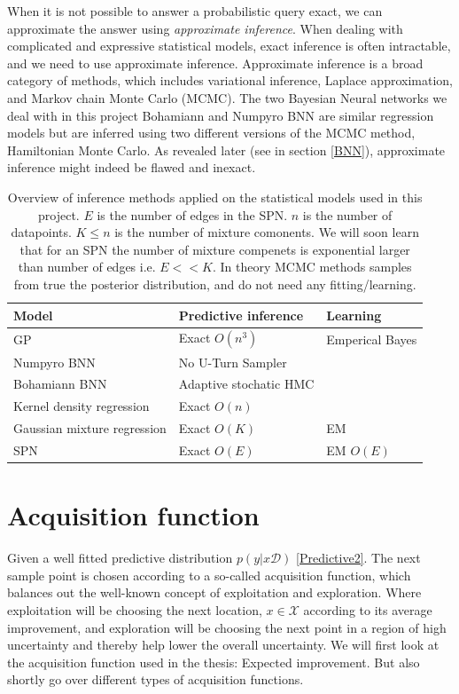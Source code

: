 When it is not possible to answer a probabilistic query exact, we can approximate the answer using
\textit{approximate inference}. When dealing with complicated and expressive statistical models,
exact inference is often intractable, and we need to use approximate inference. Approximate
inference is a broad category of methods, which includes variational inference, Laplace
approximation, and Markov chain Monte Carlo (MCMC). The two Bayesian Neural networks we deal with in
this project Bohamiann and Numpyro BNN are similar regression models but are inferred using two
different versions of the MCMC method, Hamiltonian Monte Carlo. As revealed later (see in section
\ref{BNN}), approximate inference might indeed be flawed and inexact. 

\begin{table}[H]
    \centering
    \begin{tabular}{l|l|l}
    \textbf{Model}       & \textbf{Predictive inference}    &   \textbf{Learning} \\ \hline
    GP                          & Exact $O(n^3)$            & Emperical Bayes\\
    Numpyro BNN                 & No U-Turn Sampler         & \\
    Bohamiann BNN               & Adaptive stochatic HMC    & \\
    Kernel density regression   & Exact $O(n)$              & \\
    Gaussian mixture regression & Exact $O(K)$              & EM  \\
    SPN                         & Exact $O(E)$              &  EM $O(E)$\\
    \end{tabular}
    \caption{Overview of inference methods applied on the statistical models 
            used in this project. $E$ is the number of edges in the SPN. $n$ is the number of datapoints. 
            $K \leq n$ is the number of mixture comonents. We will soon learn that for an
            SPN the number of mixture compenets is exponential larger than number of edges
            i.e. $E << K$. In theory MCMC methods samples 
            from true the posterior distribution, and do not need any fitting/learning. 
            }
\end{table}


\section{Acquisition function}
Given a well fitted predictive distribution $p(y|x\mathcal{D})$ \eqref{Predictive2}. The next sample
point is chosen
according to a so-called acquisition function, which balances out the well-known concept of
exploitation and exploration. Where exploitation will be choosing the next location, $x \in
\mathcal{X}$ according to its average improvement, and exploration will be choosing the next point
in a region of high uncertainty and thereby help lower the overall uncertainty. We will first look
at the acquisition function used in the thesis: Expected improvement. But also shortly
go over different types of acquisition functions. 


